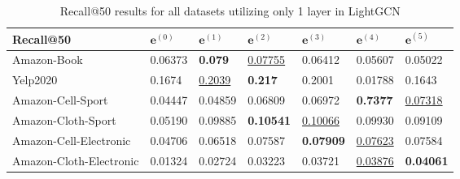 \begin{table*}[]
    \centering
    \begin{tabular}{|l|l|l|l|l|l|l|}
        \hline
        Recall@50               & $\mathbf{e}^{(0)}$ & $\mathbf{e}^{(1)}$ & $\mathbf{e}^{(2)}$  & $\mathbf{e}^{(3)}$  & $\mathbf{e}^{(4)}$  & $\mathbf{e}^{(5)}$  \\ \hline
        Amazon-Book             & 0.06373            & \textbf{0.079}     & \underline{0.07755} & 0.06412             & 0.05607             & 0.05022             \\ \hline
        Yelp2020                & 0.1674             & \underline{0.2039} & \textbf{0.217}      & 0.2001              & 0.01788             & 0.1643              \\ \hline
        Amazon-Cell-Sport       & 0.04447            & 0.04859            & 0.06809             & 0.06972             & \textbf{0.7377}     & \underline{0.07318} \\ \hline
        Amazon-Cloth-Sport      & 0.05190            & 0.09885            & \textbf{0.10541}    & \underline{0.10066} & 0.09930             & 0.09109             \\ \hline
        Amazon-Cell-Electronic  & 0.04706            & 0.06518            & 0.07587             & \textbf{0.07909}    & \underline{0.07623} & 0.07584             \\ \hline
        Amazon-Cloth-Electronic & 0.01324            & 0.02724            & 0.03223             & 0.03721             & \underline{0.03876} & \textbf{0.04061}    \\ \hline
    \end{tabular}
    \caption{Recall@50 results for all datasets utilizing only 1 layer in LightGCN}
    \label{tab:recall-individual}
\end{table*}